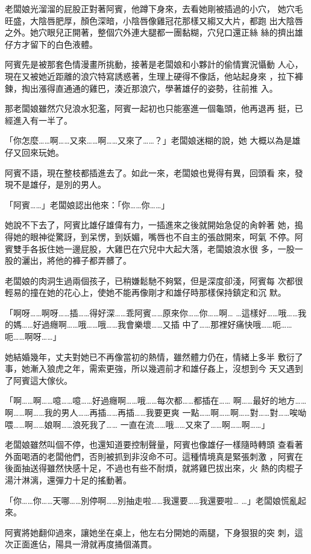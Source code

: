 老闆娘光溜溜的屁股正對著阿賓，他蹲下身來，去看她剛被插過的小穴，
她穴毛旺盛，大陰唇肥厚，顏色深暗，小陰唇像雞冠花那樣又縐又大片，都跑
出大陰唇之外。她穴眼兒正開著，整個穴外連大腿都一團黏糊，穴兒口還正絲
絲的擠出雄仔方才留下的白色液體。

阿賓先是被那套色情漫畫所挑動，接著是老闆娘和小夥計的偷情實況懾動
人心，現在又被她近距離的浪穴特寫誘惑著，生理上硬得不像話，他站起身來
，拉下褲鍊，掏出漲得直通通的雞巴，湊近那浪穴，學著雄仔的姿勢，往前推
入。

那老闆娘雖然穴兒浪水犯濫，阿賓一起初也只能塞進一個龜頭，他再退再
挺，已經進入有一半了。

「你怎麼……啊……又來……啊……又來了……？」老闆娘迷糊的說，她
大概以為是雄仔又回來玩她。

阿賓不語，現在整枝都插進去了。如此一來，老闆娘也覺得有異，回頭看
來，發現不是雄仔，是別的男人。

「阿賓……」老闆娘認出他來：「你……你……」

她說不下去了，阿賓比雄仔雄偉有力，一插進來之後就開始急促的肏幹著
她，搗得她的眼神從驚訝，到呆愣，到妖媚，嘴唇也不自主的張啟開來，呵氣
不停。阿賓雙手各扳住她一邊屁股，大雞巴在穴兒中大起大落，老闆娘浪水很
多，一股一股的灑出，將他的褲子都弄髒了。

老闆娘的肉洞生過兩個孩子，已稍嫌鬆馳不夠緊，但是深度卻淺，阿賓每
次都很輕易的撞在她的花心上，使她不能再像剛才和雄仔時那樣保持鎮定和沉
默。

「啊呀……啊呀……插……得好深……乖阿賓……原來你……你……啊…
…這樣好……哦……我的媽……好過癮啊……哦……哦……我會樂壞……又插
中了……那裡好痛快哦……呃……呃……啊呀……」

她結婚幾年，丈夫對她已不再像當初的熱情，雖然體力仍在，情緒上多半
敷衍了事，她漸入狼虎之年，需索更強，所以幾週前才和雄仔姦上，沒想到今
天又遇到了阿賓這大傢伙。

「啊……啊……噫……噫……好過癮啊……哦……每次都……都插在……
啊……最好的地方……啊……啊……我的男人……再插……再插……我要更爽
一點……啊……啊……對……對……唉呦喂……啊……娘啊……浪死我了……
一直在流……哦……又來了……啊……啊……」

老闆娘雖然叫個不停，也還知道要控制聲量，阿賓也像雄仔一樣隨時轉頭
查看著外面喝酒的老闆他們，否則被抓到非沒命不可。這種情境真是緊張刺激
，阿賓在後面抽送得雖然快感十足，不過也有些不耐煩，就將雞巴拔出來，火
熱的肉棍子湯汁淋漓，還彈力十足的搖動著。

「你……你……天哪……別停啊……別抽走啦……我還要……我還要啦…
…」老闆娘慌亂起來。

阿賓將她翻仰過來，讓她坐在桌上，他左右分開她的兩腿，下身狠狠的突
刺，這次正面進佔，陽具一滑就再度捅個滿貫。


